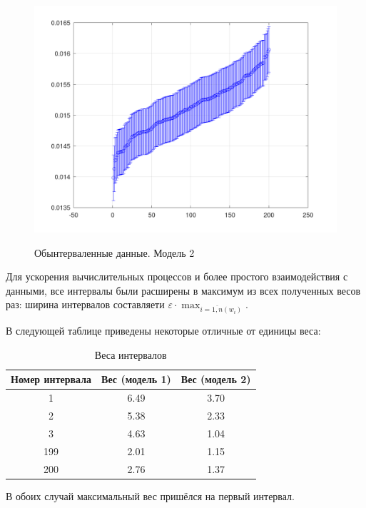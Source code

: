 \begin{figure}[H]
	\begin{center}
		\includegraphics[scale=0.29]{interval_problem_2}
		\label{pic:model2}
		\caption{Обынтерваленные данные. Модель 2}
	\end{center}
\end{figure}

Для ускорения вычислительных процессов и более простого взаимодействия с данными, все интервалы были расширены в максимум из всех полученных весов раз: ширина интервалов составляети $\varepsilon \cdot \max_{i=\overline{1,n}(w_i)}$.

В следующей таблице приведены некоторые отличные от единицы веса:

\begin{table}[H]
	\begin{center}
		\begin{tabular}{|c|c|c|}
			\hline
			Номер интервала & Вес (модель 1) & Вес (модель 2) \\
			\hline
			1 & 6.49 & 3.70 \\
			\hline
			2 & 5.38 & 2.33 \\
			\hline
			3 & 4.63 & 1.04 \\
			\hline
			199 & 2.01 & 1.15  \\
			\hline
			200 & 2.76 & 1.37 \\
			\hline
		\end{tabular}
		\caption{Веса интервалов}
	\end{center}
\end{table}

В обоих случай максимальный вес пришёлся на первый интервал.

